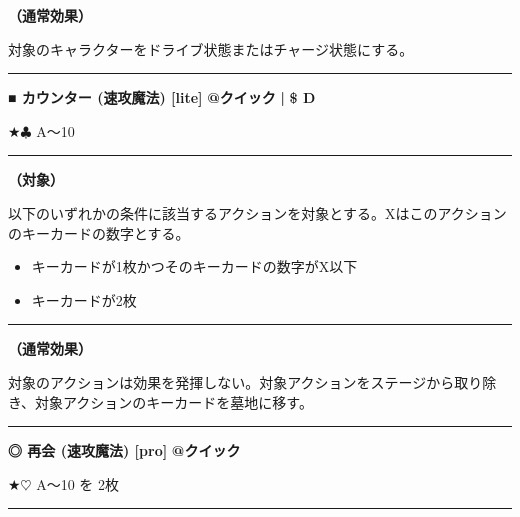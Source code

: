\documentclass[twocolumn,a5paper,papersize,10pt]{jarticle}
\begin{document}
{\bf（通常効果）}

対象のキャラクターをドライブ状態またはチャージ状態にする。
\vspace{2mm} %
\hrule height 0.5mm depth 0mm width 66.5mm %
\vspace{1mm} %
{\normalsize\bf ■ カウンター {\scriptsize (速攻魔法) [lite]}} %
\hfill 
{\small\bf @クイック }
  {\small\bf | } {\small\bf \$ D}

★{\normalsize $\clubsuit$} A〜10

\vspace{1mm}%
\hrule height 0.1mm depth 0mm width 66.5mm %
\vspace{1mm}%
{\bf（対象）}

以下のいずれかの条件に該当するアクションを対象とする。Xはこのアクションのキーカードの数字とする。


\vspace{-1zh}%
\begin{itemize}
\setlength{\leftskip}{-0.3cm}
\setlength{\parskip}{0pt} %

\item キーカードが1枚かつそのキーカードの数字がX以下

\item キーカードが2枚
\vspace{-1zh}%
\end{itemize}
\vspace{1mm}%
\hrule height 0.1mm depth 0mm width 66.5mm %
\vspace{1mm}%

{\bf（通常効果）}

対象のアクションは効果を発揮しない。対象アクションをステージから取り除き、対象アクションのキーカードを墓地に移す。
\vspace{2mm} %
\hrule height 0.5mm depth 0mm width 66.5mm %
\vspace{1mm} %
{\normalsize\bf ◎ 再会 {\scriptsize (速攻魔法) [pro]}} %
\hfill 
{\small\bf @クイック }

★{\normalsize $\heartsuit$} A〜10 を 2枚

\vspace{1mm}%
\hrule height 0.1mm depth 0mm width 66.5mm %
\vspace{1mm}%
\end{document}
